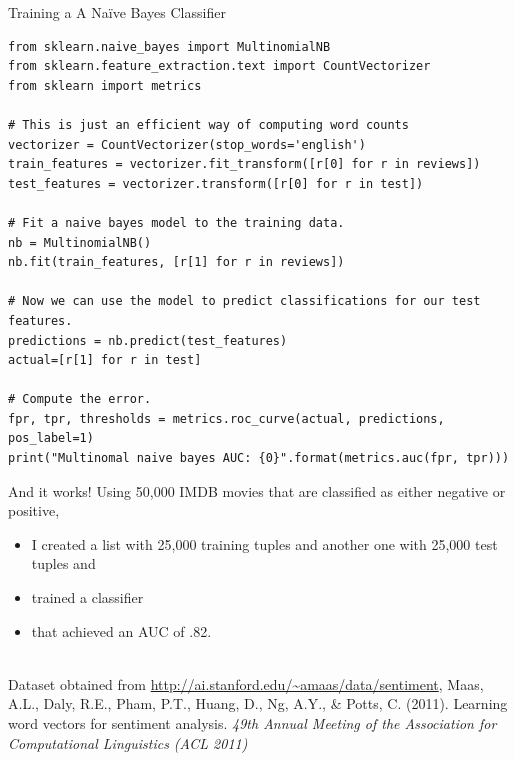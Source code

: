 \documentclass[handout]{beamer}
\begin{document}
\begin{frame}[fragile]{Training a A Naïve Bayes Classifier}
\begin{lstlisting}
from sklearn.naive_bayes import MultinomialNB
from sklearn.feature_extraction.text import CountVectorizer
from sklearn import metrics
 
# This is just an efficient way of computing word counts
vectorizer = CountVectorizer(stop_words='english')
train_features = vectorizer.fit_transform([r[0] for r in reviews])
test_features = vectorizer.transform([r[0] for r in test])
 
# Fit a naive bayes model to the training data.
nb = MultinomialNB()
nb.fit(train_features, [r[1] for r in reviews])
 
# Now we can use the model to predict classifications for our test features.
predictions = nb.predict(test_features)
actual=[r[1] for r in test]
 
# Compute the error.
fpr, tpr, thresholds = metrics.roc_curve(actual, predictions, pos_label=1)
print("Multinomal naive bayes AUC: {0}".format(metrics.auc(fpr, tpr)))

\end{lstlisting}
\end{frame}
%


\begin{frame}{And it works!}
Using 50,000 IMDB movies that are classified as either negative or positive,
\begin{itemize}
\item I created a list with 25,000 training tuples and another one with 25,000 test tuples and
\item trained a classifier
\item that achieved an AUC of .82.
\end{itemize}
~\\
\tiny{Dataset obtained from \url{http://ai.stanford.edu/~amaas/data/sentiment}, Maas, A.L., Daly, R.E., Pham, P.T., Huang, D., Ng, A.Y., \& Potts, C. (2011). Learning word vectors for sentiment analysis. \emph{49th Annual Meeting of the Association for Computational Linguistics (ACL 2011)}
}

\end{frame}
\end{document}
